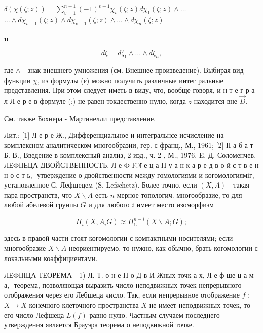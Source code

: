 \documentclass[10pt]{article}
\begin{document}
$\delta(\chi(\zeta ; z))=\sum_{v=1}^{n-1}(-1)^{v-1} \chi_{v}(\zeta ; z) d \chi_{1}(\zeta ; z) \wedge \ldots$ $\ldots \wedge d \chi_{v-1}(\zeta ; z) \wedge d \chi_{v+1}(\zeta ; z) \wedge \ldots \wedge d \chi_{n}(\zeta ; z)$



$\mathbf{u}$



\[

d \zeta=d \zeta_{1} \wedge \ldots \wedge d \zeta_{n},

\]



где $\wedge$ - знак внешнего умножения (см. Внешнее произведение). Выбирая вид функции $\chi$, из формулы (є) можно получить различные интег ральные представления. ІІри этом следует иметь в виду, что, вообще говоря, и н т е г р а л Л е р е в формуле (;) не равен токдественно нулю, когда $z$ находится вне $\vec{D}$.



См. также Бохнера - Мартинелли представление.



Лит.: [1] Л е р е Ж., Дифференциальное и интегральнсе исчисление на комплексном аналитическом многообразии, гер. с франц., М., 1961; [2] ІІ а б а т Б. В., Введение в комплексный анализ, 2 изд., ч. 2 , М., 1976. E. Д. Соломенчев. ЛЕФІІЕЦА ДВОЙСТВЕННОСТЬ, Л е Ф Іा е ц а П у а н к а р е д в о й с т в е н н о с т ь,- утверждение о двойственности между гомологиями и когомологияміг, установленное С. Лефшецем (S. Lefschetz). Более точно, если $(X, A)$ - такая пара пространств, что $X \backslash A$ есть $n$-мерное топологич. многообразие, то для любой абелевой грунпы $G$ и для любого $i$ имеет место изоморфизм



\[

H_{i}\left(X, A_{i} G\right) \approx H_{C}^{n-i}(X \backslash A ; G) ;

\]



здесь в правой части стоят когомологии с компактными носителями; если многообразие $X \backslash A$ неориентируемо, то нужно, как обычно, брать когомологии с локальными коәффициентами.



ЛЕФІІІЦА ТЕОРЕМА - 1) Л. Т. о н е П о Д в И Жных точк а х, Л е ф ше ц а м а,- теорема, позволяющая выразить число неподвижных точек непрерывного отображения через его Лебшеца число. Так, если непрерывное отображение $f$ : $X \rightarrow X$ конечного клеточного пространства $X$ не имеет неподвижных точек, то его число Лефшеца $L(f)$ равно нулю. Частным случаем последнего утверждения является Брауэра теорема о неподвижной точке.
\end{document}

